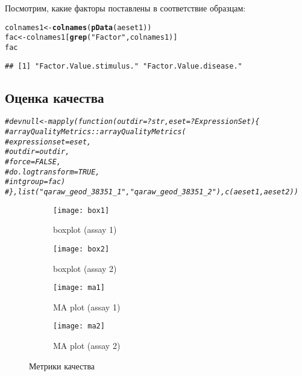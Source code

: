 \documentclass{article}
\makeatletter
\newcommand{\hlstr}[1]{\textcolor[rgb]{0.192,0.494,0.8}{#1}}%
\newcommand{\hlcom}[1]{\textcolor[rgb]{0.678,0.584,0.686}{\textit{#1}}}%
\newcommand{\hlstd}[1]{\textcolor[rgb]{0.345,0.345,0.345}{#1}}%
\newcommand{\hlkwb}[1]{\textcolor[rgb]{0.69,0.353,0.396}{#1}}%
\newcommand{\hlkwd}[1]{\textcolor[rgb]{0.737,0.353,0.396}{\textbf{#1}}}%
\newenvironment{kframe}{%
 \def\at@end@of@kframe{}%
 \ifinner\ifhmode%
  \def\at@end@of@kframe{\end{minipage}}%
  \begin{minipage}{\columnwidth}%
 \fi\fi%
 \def\FrameCommand##1{\hskip\@totalleftmargin \hskip-\fboxsep
 \colorbox{shadecolor}{##1}\hskip-\fboxsep
     \hskip-\linewidth \hskip-\@totalleftmargin \hskip\columnwidth}%
 \MakeFramed {\advance\hsize-\width
   \@totalleftmargin\z@ \linewidth\hsize
   \@setminipage}}%
 {\par\unskip\endMakeFramed%
 \at@end@of@kframe}
\newenvironment{knitrout}{}{} %
\newcommand{\myPictWidth}{.99\textwidth}
\makeatother
\begin{document}
Посмотрим, какие факторы поставлены в соответствие образцам:
\begin{knitrout}
\color{fgcolor}\begin{kframe}
\begin{alltt}
\hlstd{colnames1} \hlkwb{<-} \hlkwd{colnames}\hlstd{(}\hlkwd{pData}\hlstd{(aeset1))}
\hlstd{fac} \hlkwb{<-} \hlstd{colnames1[}\hlkwd{grep}\hlstd{(}\hlstr{"Factor"}\hlstd{, colnames1)]}
\hlstd{fac}
\end{alltt}
\begin{verbatim}
## [1] "Factor.Value.stimulus." "Factor.Value.disease."
\end{verbatim}
\end{kframe}
\end{knitrout}

\subsection{Оценка качества}
\begin{knitrout}
\color{fgcolor}\begin{kframe}
\begin{alltt}
\hlcom{# devnull <- mapply(function(outdir = ? str, eset = ? ExpressionSet) \{}
\hlcom{#  arrayQualityMetrics::arrayQualityMetrics(}
\hlcom{#    expressionset = eset,}
\hlcom{#    outdir = outdir,}
\hlcom{#    force = FALSE,}
\hlcom{#    do.logtransform = TRUE,}
\hlcom{#    intgroup = fac)}
\hlcom{#\}, list("qaraw_geod_38351_1", "qaraw_geod_38351_2"), c(aeset1, aeset2))}
\end{alltt}
\end{kframe}
\end{knitrout}

\begin{figure}[H]
    \centering
    \begin{subfigure}{.5\textwidth}
        \centering
        \texttt{[image: box1]}
        \caption{boxplot (assay 1)}
    \end{subfigure}%
    \begin{subfigure}{.5\textwidth}
        \centering
        \texttt{[image: box2]}
        \caption{boxplot (assay 2)}
    \end{subfigure}
    \begin{subfigure}{.5\textwidth}
        \centering
        \texttt{[image: ma1]}
        \caption{MA plot (assay 1)}
    \end{subfigure}%
    \begin{subfigure}{.5\textwidth}
        \centering
        \texttt{[image: ma2]}
        \caption{MA plot (assay 2)}
    \end{subfigure}
\caption{Метрики качества}
\end{figure}
\end{document}
